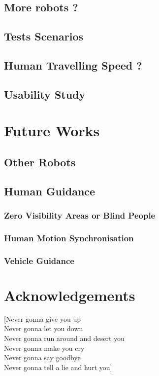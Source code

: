 \documentclass[a4paper, 12pt]{report}
\begin{document}
	\section{More robots ?}
	\section{Tests Scenarios}
	\section{Human Travelling Speed ?}
	\section{Usability Study}

\chapter{Future Works}
	\section{Other Robots}
	\section{Human Guidance}
		\subsection{Zero Visibility Areas or Blind People}
		\subsection{Human Motion Synchronisation}
		\subsection{Vehicle Guidance}

\chapter{Acknowledgements}

[Never gonna give you up\\
Never gonna let you down\\
Never gonna run around and desert you\\
Never gonna make you cry\\
Never gonna say goodbye\\
Never gonna tell a lie and hurt you]
\end{document}
